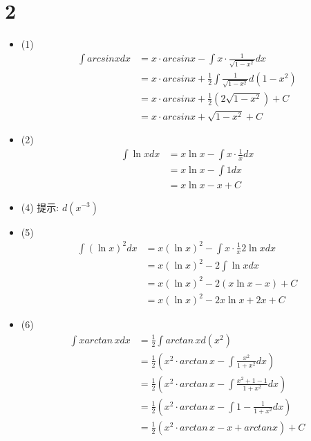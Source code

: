 \documentclass{article}
\begin{document}
\section*{2}

\begin{itemize}
  \item (1)
        \begin{align*}
          \int arcsin x dx
           & = x \cdot arcsin x - \int x \cdot \frac{1}{\sqrt{1 - x^2}} dx             \\
           & = x \cdot arcsin x + \frac{1}{2} \int \frac{1}{\sqrt{1 - x^2}} d(1 - x^2) \\
           & = x \cdot arcsin x + \frac{1}{2} (2 \sqrt{1 - x^2}) + C                   \\
           & = x \cdot arcsin x + \sqrt{1 - x^2} + C
        \end{align*}

  \item (2)
        \begin{align*}
          \int \ln x dx
           & = x \ln x - \int x \cdot \frac{1}{x} dx \\
           & = x \ln x - \int 1 dx                   \\
           & = x \ln x - x + C
        \end{align*}

  \item (4)
        提示: $d(x^{-3})$

  \item (5)
        \begin{align*}
          \int (\ln x)^2 dx
           & = x (\ln x)^2 - \int x \cdot \frac{1}{x} 2 \ln x dx \\
           & = x (\ln x)^2 - 2 \int \ln x dx                     \\
           & = x (\ln x)^2 - 2 (x \ln x - x ) + C                \\
           & = x (\ln x)^2 - 2 x \ln x + 2 x + C
        \end{align*}

  \item (6)
        \begin{align*}
          \int x arctan \, x dx
           & = \frac{1}{2} \int arctan \, x d(x^2)                                                   \\
           & = \frac{1}{2} \left(x^2 \cdot arctan \, x - \int \frac{x^2}{1 + x^2} dx \right)         \\
           & = \frac{1}{2} \left(x^2 \cdot arctan \, x - \int \frac{x^2 + 1 - 1}{1 + x^2} dx \right) \\
           & = \frac{1}{2} \left(x^2 \cdot arctan \, x - \int 1 - \frac{1}{1 + x^2} dx \right)       \\
           & = \frac{1}{2} \left(x^2 \cdot arctan \, x - x + arctan x \right) + C
        \end{align*}


\end{itemize}
\end{document}
